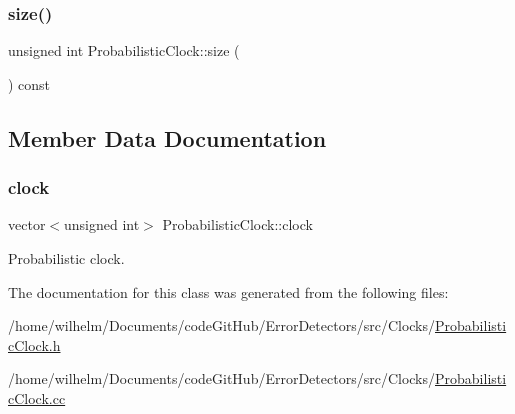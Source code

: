 \subsubsection{\texorpdfstring{size()}{size()}}
{\footnotesize\ttfamily unsigned int Probabilistic\+Clock\+::size (\begin{DoxyParamCaption}{ }\end{DoxyParamCaption}) const}



\subsection{Member Data Documentation}
\mbox{\label{class_probabilistic_clock_a4839958d0e2368cec8bb159b69ac0e76}} 
\subsubsection{\texorpdfstring{clock}{clock}}
{\footnotesize\ttfamily vector$<$unsigned int$>$ Probabilistic\+Clock\+::clock\hspace{0.3cm}{\ttfamily [private]}}



Probabilistic clock. 



The documentation for this class was generated from the following files\+:\begin{DoxyCompactItemize}
\item 
/home/wilhelm/\+Documents/code\+Git\+Hub/\+Error\+Detectors/src/\+Clocks/\hyperlink{_probabilistic_clock_8h}{Probabilistic\+Clock.\+h}\item 
/home/wilhelm/\+Documents/code\+Git\+Hub/\+Error\+Detectors/src/\+Clocks/\hyperlink{_probabilistic_clock_8cc}{Probabilistic\+Clock.\+cc}\end{DoxyCompactItemize}
